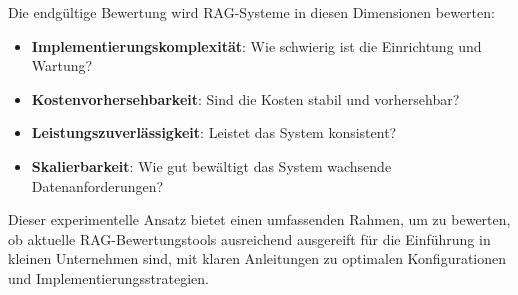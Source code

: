 Die endgültige Bewertung wird RAG-Systeme in diesen Dimensionen bewerten:
\begin{itemize}
    \item \textbf{Implementierungskomplexität}: Wie schwierig ist die Einrichtung und Wartung?
    \item \textbf{Kostenvorhersehbarkeit}: Sind die Kosten stabil und vorhersehbar?
    \item \textbf{Leistungszuverlässigkeit}: Leistet das System konsistent?
    \item \textbf{Skalierbarkeit}: Wie gut bewältigt das System wachsende Datenanforderungen?
\end{itemize}

Dieser experimentelle Ansatz bietet einen umfassenden Rahmen, um zu bewerten, ob aktuelle RAG-Bewertungstools ausreichend ausgereift für die Einführung in kleinen Unternehmen sind, mit klaren Anleitungen zu optimalen Konfigurationen und Implementierungsstrategien. 